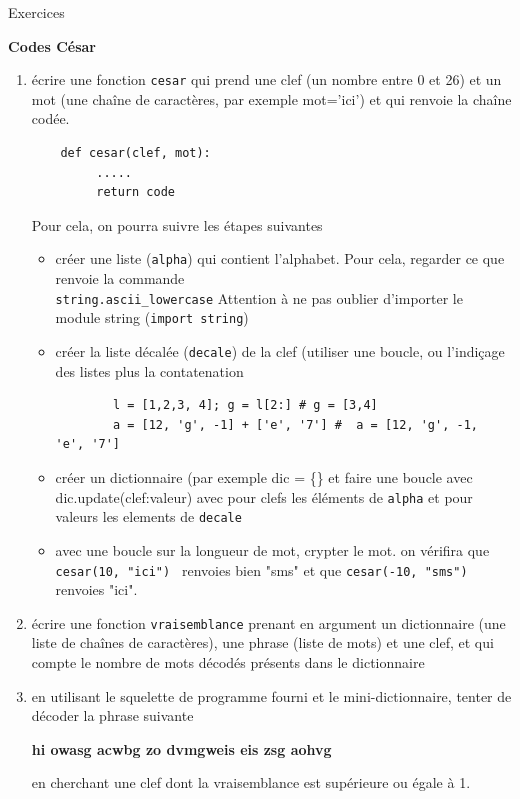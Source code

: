 \documentclass[12pt]{letter}
\begin{document}
\begin{center}
{\Large Exercices  }
\end{center}

\textbf{Codes César}
\begin{enumerate}
   \item écrire une fonction \texttt{cesar} qui prend une clef (un nombre entre 0 et 26) et un mot (une chaîne de caractères, par exemple mot='ici')
   et qui renvoie la chaîne codée. 
   \begin{lstlisting}
    def cesar(clef, mot):
         .....
         return code
   \end{lstlisting}
   Pour cela, on pourra suivre les étapes suivantes 
    \begin{itemize}
      \item créer une liste (\texttt{alpha}) qui contient l'alphabet. Pour cela, regarder ce que renvoie la commande \\ 
      \texttt{string.ascii\_lowercase}
      Attention à ne pas oublier d'importer le module string (\texttt{import string})
      \item créer la liste décalée (\texttt{decale}) de la clef (utiliser une boucle, ou l'indiçage des listes plus la contatenation 
      \begin{lstlisting}
        l = [1,2,3, 4]; g = l[2:] # g = [3,4]
        a = [12, 'g', -1] + ['e', '7'] #  a = [12, 'g', -1, 'e', '7']
       \end{lstlisting}
      \item créer un dictionnaire (par exemple dic = \{\} et faire une boucle avec dic.update({clef:valeur}) avec pour clefs les éléments de \texttt{alpha} et pour valeurs les
      elements de \texttt{decale}
      \item avec une boucle sur la longueur de mot, crypter le mot. on vérifira que
      \texttt{cesar(10, "ici") } renvoies bien "sms" et que \texttt{cesar(-10, "sms") } renvoies "ici".
    \end{itemize}
   \item écrire une fonction \texttt{vraisemblance} prenant en argument un dictionnaire (une liste de chaînes de caractères), 
   une phrase (liste de mots) et une clef, et qui compte le nombre de mots décodés présents dans le dictionnaire
   \item en utilisant le squelette de programme fourni et le mini-dictionnaire, tenter de décoder la phrase suivante \\
   \begin{center}
   {\large \bf hi owasg acwbg zo dvmgweis eis zsg aohvg}
   \end{center} 
   \vspace{0.5cm}
   en cherchant une clef dont la vraisemblance est supérieure ou égale à 1.
\end{enumerate}
\end{document}
